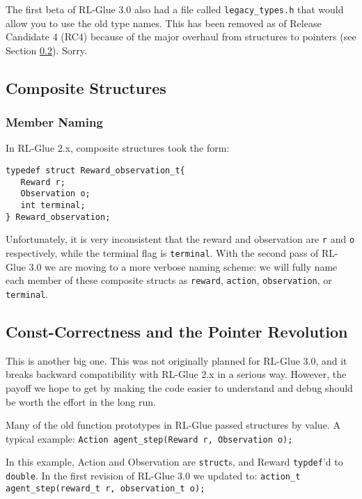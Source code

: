 \documentclass[11pt]{article}
\begin{document}
The first beta of RL-Glue 3.0 also had a file called \texttt{legacy\_types.h} that would allow you to use the old type names.  This has been removed as of Release Candidate 4 (RC4) because of the major overhaul from structures to pointers (see Section \ref{pointers}). Sorry. 

\subsection{Composite Structures}

\subsubsection{Member Naming}
In RL-Glue 2.x, composite structures took the form:
\begin{verbatim}
typedef struct Reward_observation_t{
   Reward r;
   Observation o;
   int terminal;
} Reward_observation;
\end{verbatim}

Unfortunately, it is very inconsistent that the reward and observation are \texttt{r} and \texttt{o} respectively, 
while the terminal flag is \texttt{terminal}.  With the second pass of RL-Glue 3.0 we are moving to a more verbose 
naming scheme: we will fully name each member of these composite structs as \texttt{reward}, \texttt{action}, 
\texttt{observation}, or \texttt{terminal}.




\subsection{Const-Correctness and the Pointer Revolution}
\label{pointers}
This is another big one.  This was not originally planned for RL-Glue 3.0, and it breaks backward compatibility with RL-Glue
2.x in a serious way.  However, the payoff we hope to get by making the code easier to understand and debug should be 
worth the effort in the long run.

Many of the old function prototypes in RL-Glue passed structures by value.  A typical example:\newline
\texttt{Action agent\_step(Reward r, Observation o);}

In this example, Action and Observation are \texttt{struct}s, and Reward \texttt{typdef}'d to \texttt{double}.  In the 
first revision of RL-Glue 3.0 we updated to:\newline
\texttt{action\_t agent\_step(reward\_t r, observation\_t o);}
\end{document}
